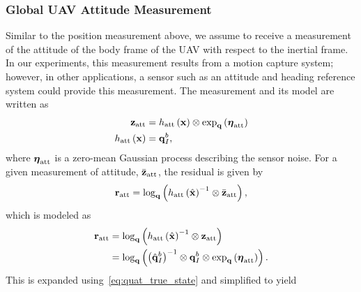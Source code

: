\subsubsection{Global UAV Attitude Measurement}
Similar to the position measurement above, we assume to receive a measurement of
the attitude of the body frame of the UAV with respect to the inertial frame.
In our experiments, this measurement results from a motion capture system;
however, in other applications, a sensor such as an attitude and heading
reference system could provide this measurement.
The measurement and its model are 
written as
\begin{align}
  \boldsymbol{\mathrm{z}}_{\text{att}} &= h_{\text{att}} \left( \boldsymbol{\mathrm{x}} \right) \otimes \exp_{\boldsymbol{\mathrm{q}}} \left(
  \boldsymbol{\mathrm{\eta}}_{\text{att}} \right) \\
  h_{\text{att}} \left( \boldsymbol{\mathrm{x}} \right) &= \boldsymbol{\mathrm{q}}_{I}^b, 
\end{align}
where $\boldsymbol{\mathrm{\eta}}_{\text{att}}$ is a zero-mean Gaussian process
describing the sensor noise.
For a given measurement of attitude, $\bar{\boldsymbol{\mathrm{z}}}_{\text{att}}$, the residual is
given by
\begin{equation}
  \boldsymbol{\mathrm{r}}_{\text{att}} = \log_{\boldsymbol{\mathrm{q}}} \left(  h_{\text{att}} \left(
  \hat{\boldsymbol{\mathrm{x}}} \right)^{-1} \otimes \bar{\boldsymbol{\mathrm{z}}}_{\text{att}} \right),
\end{equation}
which is modeled as
\begin{align}
  \boldsymbol{\mathrm{r}}_{\text{att}} &= \log_{\boldsymbol{\mathrm{q}}} \left(  h_{\text{att}} \left(
  \hat{\boldsymbol{\mathrm{x}}} \right)^{-1} \otimes \boldsymbol{\mathrm{z}}_{\text{att}} \right) \\
                        &= \log_{\boldsymbol{\mathrm{q}}} \left(  \left(
  \hat{\boldsymbol{\mathrm{q}}}_{I}^b \right)^{-1} \otimes \boldsymbol{\mathrm{q}}_{I}^b \otimes \exp_{\boldsymbol{\mathrm{q}}} \left(
  \boldsymbol{\mathrm{\eta}}_{\text{att}} \right)\right).
\end{align}
This is expanded using~\eqref{eq:quat_true_state} and simplified to yield
